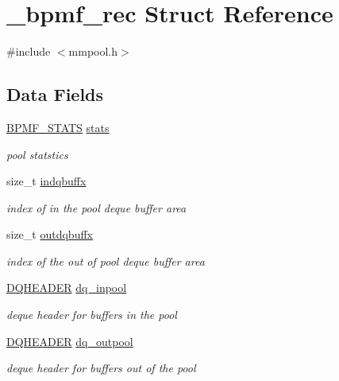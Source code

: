 \hypertarget{struct__bpmf__rec}{\section{\-\_\-bpmf\-\_\-rec Struct Reference}
\label{struct__bpmf__rec}
}


{\ttfamily \#include $<$mmpool.\-h$>$}

\subsection*{Data Fields}
\begin{DoxyCompactItemize}
\item 
\hyperlink{mmpool_8h_a0c142d5c3fd113592173c44a84ca032a}{B\-P\-M\-F\-\_\-\-S\-T\-A\-T\-S} \hyperlink{struct__bpmf__rec_a7eb91595fe23c00abff0ea998b98335d}{stats}
\begin{DoxyCompactList}\small\item\em pool statstics \end{DoxyCompactList}\item 
size\-\_\-t \hyperlink{struct__bpmf__rec_af137461fa262d2ab95ae8001687af33a}{indqbuffx}
\begin{DoxyCompactList}\small\item\em index of in the pool deque buffer area \end{DoxyCompactList}\item 
size\-\_\-t \hyperlink{struct__bpmf__rec_aca543d61af032d0a2169888529e53c98}{outdqbuffx}
\begin{DoxyCompactList}\small\item\em index of the out of pool deque buffer area \end{DoxyCompactList}\item 
\hyperlink{struct_d_q_h_e_a_d_e_r}{D\-Q\-H\-E\-A\-D\-E\-R} \hyperlink{struct__bpmf__rec_a1df7df505d12e5d990076681f0f88f58}{dq\-\_\-inpool}
\begin{DoxyCompactList}\small\item\em deque header for buffers in the pool \end{DoxyCompactList}\item 
\hyperlink{struct_d_q_h_e_a_d_e_r}{D\-Q\-H\-E\-A\-D\-E\-R} \hyperlink{struct__bpmf__rec_adeae43b3e9243d22edc2ec8f16cb540f}{dq\-\_\-outpool}
\begin{DoxyCompactList}\small\item\em deque header for buffers out of the pool \end{DoxyCompactList}\end{DoxyCompactItemize}


